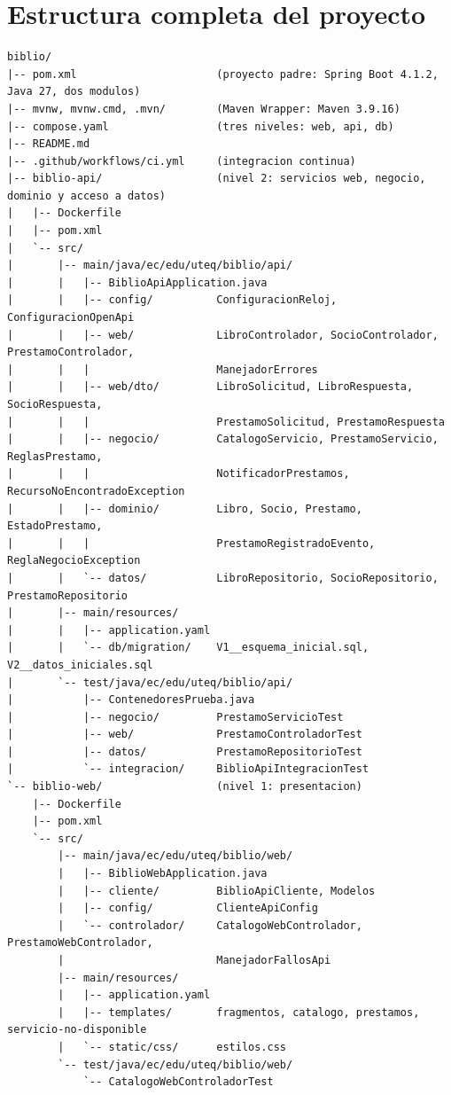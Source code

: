 \chapter{Estructura completa del proyecto}\label{ap:estructura}

\begin{lstlisting}[numbers=none,caption={Archivos del proyecto BiblioUTEQ},label={lst:arbol}]
biblio/
|-- pom.xml                      (proyecto padre: Spring Boot 4.1.2, Java 27, dos modulos)
|-- mvnw, mvnw.cmd, .mvn/        (Maven Wrapper: Maven 3.9.16)
|-- compose.yaml                 (tres niveles: web, api, db)
|-- README.md
|-- .github/workflows/ci.yml     (integracion continua)
|-- biblio-api/                  (nivel 2: servicios web, negocio, dominio y acceso a datos)
|   |-- Dockerfile
|   |-- pom.xml
|   `-- src/
|       |-- main/java/ec/edu/uteq/biblio/api/
|       |   |-- BiblioApiApplication.java
|       |   |-- config/          ConfiguracionReloj, ConfiguracionOpenApi
|       |   |-- web/             LibroControlador, SocioControlador, PrestamoControlador,
|       |   |                    ManejadorErrores
|       |   |-- web/dto/         LibroSolicitud, LibroRespuesta, SocioRespuesta,
|       |   |                    PrestamoSolicitud, PrestamoRespuesta
|       |   |-- negocio/         CatalogoServicio, PrestamoServicio, ReglasPrestamo,
|       |   |                    NotificadorPrestamos, RecursoNoEncontradoException
|       |   |-- dominio/         Libro, Socio, Prestamo, EstadoPrestamo,
|       |   |                    PrestamoRegistradoEvento, ReglaNegocioException
|       |   `-- datos/           LibroRepositorio, SocioRepositorio, PrestamoRepositorio
|       |-- main/resources/
|       |   |-- application.yaml
|       |   `-- db/migration/    V1__esquema_inicial.sql, V2__datos_iniciales.sql
|       `-- test/java/ec/edu/uteq/biblio/api/
|           |-- ContenedoresPrueba.java
|           |-- negocio/         PrestamoServicioTest
|           |-- web/             PrestamoControladorTest
|           |-- datos/           PrestamoRepositorioTest
|           `-- integracion/     BiblioApiIntegracionTest
`-- biblio-web/                  (nivel 1: presentacion)
    |-- Dockerfile
    |-- pom.xml
    `-- src/
        |-- main/java/ec/edu/uteq/biblio/web/
        |   |-- BiblioWebApplication.java
        |   |-- cliente/         BiblioApiCliente, Modelos
        |   |-- config/          ClienteApiConfig
        |   `-- controlador/     CatalogoWebControlador, PrestamoWebControlador,
        |                        ManejadorFallosApi
        |-- main/resources/
        |   |-- application.yaml
        |   |-- templates/       fragmentos, catalogo, prestamos, servicio-no-disponible
        |   `-- static/css/      estilos.css
        `-- test/java/ec/edu/uteq/biblio/web/
            `-- CatalogoWebControladorTest
\end{lstlisting}

